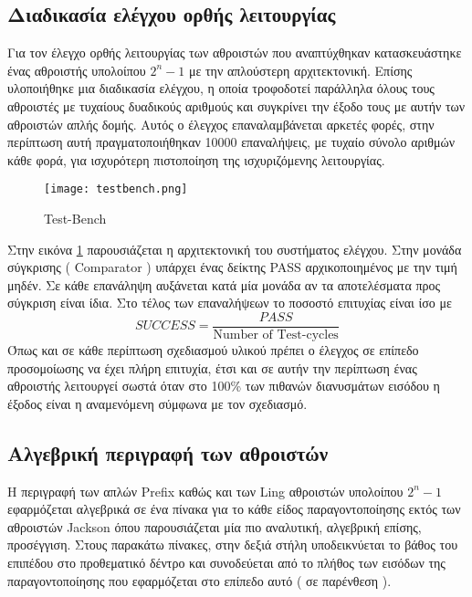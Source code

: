 \subsection{Διαδικασία ελέγχου ορθής λειτουργίας}
Για τον έλεγχο ορθής λειτουργίας των αθροιστών που αναπτύχθηκαν κατασκευάστηκε ένας αθροιστής 
υπολοίπου $2^n-1$ με την απλούστερη αρχιτεκτονική. Επίσης υλοποιήθηκε μια διαδικασία ελέγχου,
η οποία τροφοδοτεί παράλληλα όλους τους αθροιστές με τυχαίους δυαδικούς αριθμούς και συγκρίνει 
την έξοδο τους με αυτήν των αθροιστών απλής δομής. Αυτός ο έλεγχος επαναλαμβάνεται αρκετές 
φορές, στην περίπτωση αυτή πραγματοποιήθηκαν 10000 επαναλήψεις, με τυχαίο σύνολο αριθμών 
κάθε φορά, για ισχυρότερη πιστοποίηση της ισχυριζόμενης λειτουργίας.
\begin{figure}[H]
\centering
\texttt{[image: testbench.png]}
\caption{Test-Bench}
\label{fig:testbench}
\end{figure}
Στην εικόνα \ref{fig:testbench} παρουσιάζεται η αρχιτεκτονική του συστήματος ελέγχου. Στην 
μονάδα σύγκρισης ( Comparator ) υπάρχει ένας δείκτης PASS αρχικοποιημένος με την τιμή μηδέν.
Σε κάθε επανάληψη αυξάνεται κατά μία μονάδα αν τα αποτελέσματα προς σύγκριση είναι ίδια.
Στο τέλος των επαναλήψεων το ποσοστό επιτυχίας είναι ίσο με 
\begin{equation*}
    SUCCESS = \frac{PASS}{\text{Number of Test-cycles}}
\end{equation*}
Όπως και σε κάθε περίπτωση σχεδιασμού υλικού πρέπει ο έλεγχος σε επίπεδο προσομοίωσης να
έχει πλήρη επιτυχία, έτσι και σε αυτήν την περίπτωση ένας αθροιστής λειτουργεί σωστά όταν 
στο 100\% των πιθανών διανυσμάτων εισόδου η έξοδος είναι η αναμενόμενη σύμφωνα με τον σχεδιασμό.













\subsection{Αλγεβρική περιγραφή των αθροιστών}

Η περιγραφή των απλών Prefix καθώς και των Ling αθροιστών υπολοίπου $2^n-1$ 
εφαρμόζεται αλγεβρικά σε ένα πίνακα για το κάθε είδος παραγοντοποίησης εκτός
των αθροιστών Jackson όπου παρουσιάζεται μία πιο αναλυτική, αλγεβρική επίσης, προσέγγιση.
Στους παρακάτω πίνακες, στην δεξιά στήλη υποδεικνύεται το βάθος του επιπέδου στο 
προθεματικό δέντρο και συνοδεύεται από το πλήθος των εισόδων της παραγοντοποίησης 
που εφαρμόζεται στο επίπεδο αυτό ( σε παρένθεση ).

